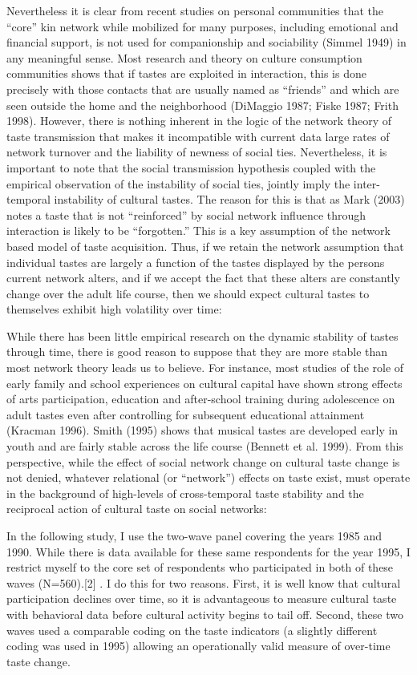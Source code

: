 Nevertheless it is clear from recent studies on personal communities that the “core” kin network while mobilized for many purposes, including emotional and financial support, is not used for companionship and sociability (Simmel 1949) in any meaningful sense. Most research and theory on culture consumption communities shows that if tastes are exploited in interaction, this is done precisely with those contacts that are usually named as “friends” and which are seen outside the home and the neighborhood (DiMaggio 1987; Fiske 1987; Frith 1998). However, there is nothing inherent in the logic of the network theory of taste transmission that makes it incompatible with current data large rates of network turnover and the liability of newness of social ties. Nevertheless, it is important to note that the social transmission hypothesis coupled with the empirical observation of the instability of social ties, jointly imply the inter-temporal instability of cultural tastes. The reason for this is that as Mark (2003) notes a taste that is not “reinforced” by social network influence through interaction is likely to be “forgotten.” This is a key assumption of the network based model of taste acquisition. Thus, if we retain the network assumption that individual tastes are largely a function of the tastes displayed by the persons current network alters, and if we accept the fact that these alters are constantly change over the adult life course, then we should expect cultural tastes to themselves exhibit high volatility over time:

While there has been little empirical research on the dynamic stability of tastes through time, there is good reason to suppose that they are more stable than most network theory leads us to believe. For instance, most studies of the role of early family and school experiences on cultural capital have shown strong effects of arts participation, education and after-school training during adolescence on adult tastes even after controlling for subsequent educational attainment (Kracman 1996). Smith (1995) shows that musical tastes are developed early in youth and are fairly stable across the life course (Bennett et al. 1999). From this perspective, while the effect of social network change on cultural taste change is not denied, whatever relational (or “network”) effects on taste exist, must operate in the background of high-levels of cross-temporal taste stability and the reciprocal action of cultural taste on social networks:

In the following study, I use the two-wave panel covering the years 1985 and 1990. While there is data available for these same respondents for the year 1995, I restrict myself to the core set of respondents who participated in both of these waves (N=560).[2] . I do this for two reasons. First, it is well know that cultural participation declines over time, so it is advantageous to measure cultural taste with behavioral data before cultural activity begins to tail off. Second, these two waves used a comparable coding on the taste indicators (a slightly different coding was used in 1995) allowing an operationally valid measure of over-time taste change.

